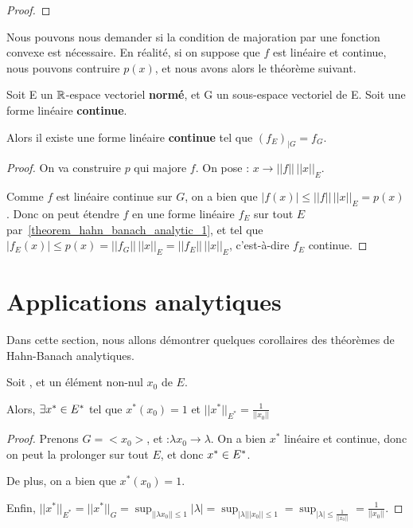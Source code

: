 \begin{proof}
	
\end{proof}

Nous pouvons nous demander si la condition de majoration par une fonction
convexe est nécessaire. En réalité, si on suppose que $f$ est linéaire et
continue, nous pouvons contruire $p(x)$, et nous avons alors le théorème
suivant.

\begin{theorem} 
\label{theorem_hahn_banach_analytic_2}
	Soit E un $\mathbb{R}$-espace vectoriel \textbf{normé}, et G un sous-espace
	vectoriel de E.
	Soit  une forme linéaire
	\textbf{continue}.

	Alors il existe une forme linéaire \textbf{continue}
	 tel que $(f_{E})_{|G} = f_{G}$.
\end{theorem}

\begin{proof}
	On va construire $p$ qui majore $f$.
	On pose : $x \rightarrow ||f|| \,
	||x||_{E}$.

	Comme $f$ est linéaire continue sur $G$, on a bien que $|f(x)| \leq ||f|| \,
	||x||_{E} = p(x)$. Donc on peut étendre $f$ en une forme linéaire $f_{E}$
	sur tout $E$ par~\ref{theorem_hahn_banach_analytic_1}, et tel que
	$|f_{E}(x)| \leq p(x) = ||f_{G}|| \, ||x||_{E} = ||f_{E}|| \, ||x||_{E}$,
	c'est-à-dire $f_{E}$ continue.
\end{proof}
\section{Applications analytiques}

Dans cette section, nous allons démontrer quelques corollaires des théorèmes de
Hahn-Banach analytiques.

\begin{corollary}
	Soit , et un élément non-nul $x_{0}$ de $E$.

	Alors, $\exists x^{*} \in E^{*}$ tel que $x^{*}(x_{0}) = 1$ et
	$||x^{*}||_{E^{*}} = \frac{1}{||x_{0}||}$
\end{corollary}

\begin{proof}
	Prenons $G = <x_{0}>$, et :$\lambda
	x_{0} \rightarrow \lambda$. On a bien $x^{*}$ linéaire et continue, donc on peut
	la prolonger sur tout $E$, et donc $x^{*} \in E^{*}$.

	De plus, on a bien que $x^{*}(x_{0}) = 1$.
	
	Enfin, $||x^{*}||_{E^{*}} = ||x^{*}||_{G} = \displaystyle \sup_{||\lambda x_{0}|| \leq
1}|\lambda| = \sup_{|\lambda|||x_{0}|| \leq 1} = \sup_{|\lambda| \leq
	\frac{1}{||x_{0}||}} = \frac{1}{||x_{0}||}$.
\end{proof}

